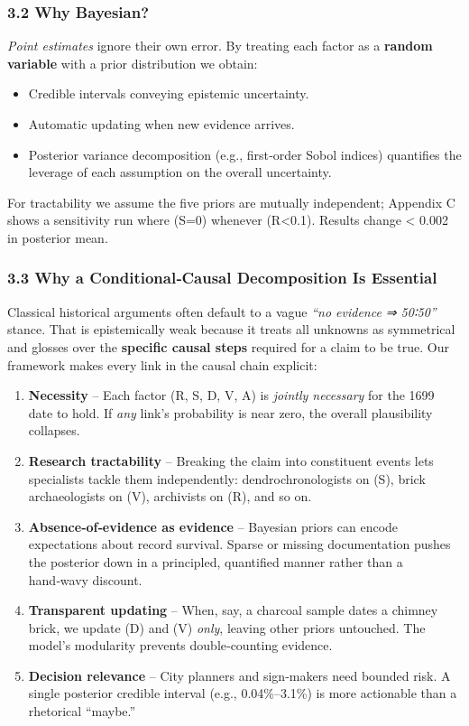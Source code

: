 \documentclass[
  11pt,
]{article}
\providecommand{\tightlist}{%
  \setlength{\itemsep}{0pt}\setlength{\parskip}{0pt}}
\begin{document}
\subsubsection{3.2 Why Bayesian?}\label{why-bayesian}

\emph{Point estimates} ignore their own error. By treating each factor
as a \textbf{random variable} with a prior distribution we obtain:

\begin{itemize}
\tightlist
\item
  Credible intervals conveying epistemic uncertainty.
\item
  Automatic updating when new evidence arrives.
\item
  Posterior variance decomposition (e.g., first‑order Sobol indices)
  quantifies the leverage of each assumption on the overall uncertainty.
\end{itemize}

For tractability we assume the five priors are mutually independent;
Appendix C shows a sensitivity run where (S=0) whenever (R\textless0.1).
Results change \textless{} 0.002 in posterior mean.

\subsubsection{3.3 Why a Conditional‑Causal Decomposition Is
Essential}\label{why-a-conditionalcausal-decomposition-is-essential}

Classical historical arguments often default to a vague \emph{``no
evidence ⇒ 50∶50''} stance. That is epistemically weak because it treats
all unknowns as symmetrical and glosses over the \textbf{specific causal
steps} required for a claim to be true. Our framework makes every link
in the causal chain explicit:

\begin{enumerate}
\def\labelenumi{\arabic{enumi}.}
\tightlist
\item
  \textbf{Necessity} -- Each factor (R, S, D, V, A) is \emph{jointly
  necessary} for the 1699 date to hold. If \emph{any} link's probability
  is near zero, the overall plausibility collapses.
\item
  \textbf{Research tractability} -- Breaking the claim into constituent
  events lets specialists tackle them independently: dendrochronologists
  on (S), brick archaeologists on (V), archivists on (R), and so on.
\item
  \textbf{Absence‑of‑evidence as evidence} -- Bayesian priors can encode
  expectations about record survival. Sparse or missing documentation
  pushes the posterior down in a principled, quantified manner rather
  than a hand‑wavy discount.
\item
  \textbf{Transparent updating} -- When, say, a charcoal sample dates a
  chimney brick, we update (D) and (V) \emph{only}, leaving other priors
  untouched. The model's modularity prevents double‑counting evidence.
\item
  \textbf{Decision relevance} -- City planners and sign‑makers need
  bounded risk. A single posterior credible interval (e.g.,
  0.04\%--3.1\%) is more actionable than a rhetorical ``maybe.''
\end{enumerate}
\end{document}
